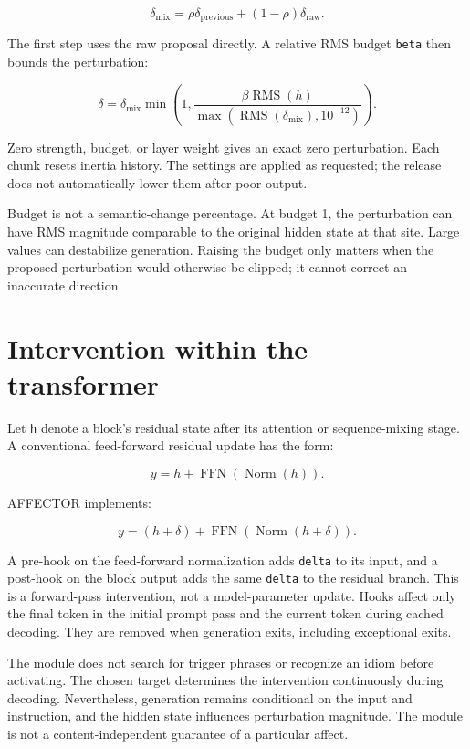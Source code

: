 \documentclass[manuscript,screen,nonacm]{acmart}
\begin{document}
\[\delta_{\mathrm{mix}}=\rho\delta_{\mathrm{previous}}+(1-\rho)\delta_{\mathrm{raw}}.\]

The first step uses the raw proposal directly. A relative RMS budget
\nolinkurl{beta} then bounds the perturbation:

\[\delta=\delta_{\mathrm{mix}}\min\left(1,\frac{\beta\operatorname{RMS}(h)}{\max(\operatorname{RMS}(\delta_{\mathrm{mix}}),10^{-12})}\right).\]

Zero strength, budget, or layer weight gives an exact zero perturbation.
Each chunk resets inertia history. The settings are applied as
requested; the release does not automatically lower them after poor
output.

Budget is not a semantic-change percentage. At budget 1, the
perturbation can have RMS magnitude comparable to the original hidden
state at that site. Large values can destabilize generation. Raising the
budget only matters when the proposed perturbation would otherwise be
clipped; it cannot correct an inaccurate direction.

\section{Intervention within the
transformer}\label{intervention-within-the-transformer}

Let \nolinkurl{h} denote a block's residual state after its attention or
sequence-mixing stage. A conventional feed-forward residual update has
the form:

\[y=h+\operatorname{FFN}(\operatorname{Norm}(h)).\]

AFFECTOR implements:

\[y=(h+\delta)+\operatorname{FFN}(\operatorname{Norm}(h+\delta)).\]

A pre-hook on the feed-forward normalization adds \nolinkurl{delta} to its
input, and a post-hook on the block output adds the same \nolinkurl{delta}
to the residual branch. This is a forward-pass intervention, not a
model-parameter update. Hooks affect only the final token in the initial
prompt pass and the current token during cached decoding. They are
removed when generation exits, including exceptional exits.

The module does not search for trigger phrases or recognize an idiom
before activating. The chosen target determines the intervention
continuously during decoding. Nevertheless, generation remains
conditional on the input and instruction, and the hidden state
influences perturbation magnitude. The module is not a
content-independent guarantee of a particular affect.
\end{document}
